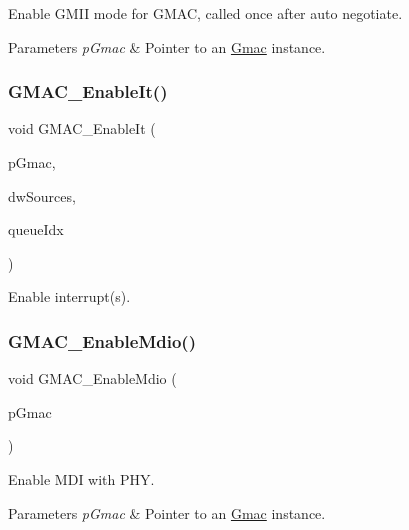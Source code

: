 Enable G\+M\+II mode for G\+M\+AC, called once after auto negotiate. 


\begin{DoxyParams}{Parameters}
{\em p\+Gmac} & Pointer to an \mbox{\hyperlink{structGmac}{Gmac}} instance. \\
\hline
\end{DoxyParams}
\mbox{\label{group__gmac__defines_ga7ada4663e83402d9ca6da62f166e115f}} 
\subsubsection{\texorpdfstring{GMAC\_EnableIt()}{GMAC\_EnableIt()}}
{\footnotesize\ttfamily void G\+M\+A\+C\+\_\+\+Enable\+It (\begin{DoxyParamCaption}\item[{\mbox{\hyperlink{structGmac}{Gmac}} $\ast$}]{p\+Gmac,  }\item[{uint32\+\_\+t}]{dw\+Sources,  }\item[{gmac\+Que\+List\+\_\+t}]{queue\+Idx }\end{DoxyParamCaption})}

Enable interrupt(s). \mbox{\label{group__gmac__defines_gabf89fc2e0cb8e9ec7e0b99a5a14cae50}} 
\subsubsection{\texorpdfstring{GMAC\_EnableMdio()}{GMAC\_EnableMdio()}}
{\footnotesize\ttfamily void G\+M\+A\+C\+\_\+\+Enable\+Mdio (\begin{DoxyParamCaption}\item[{\mbox{\hyperlink{structGmac}{Gmac}} $\ast$}]{p\+Gmac }\end{DoxyParamCaption})}



Enable M\+DI with P\+HY. 


\begin{DoxyParams}{Parameters}
{\em p\+Gmac} & Pointer to an \mbox{\hyperlink{structGmac}{Gmac}} instance. \\
\hline
\end{DoxyParams}
\mbox{\label{group__gmac__defines_ga1c7cb7972602f58f16fc89bcaf542107}} 
